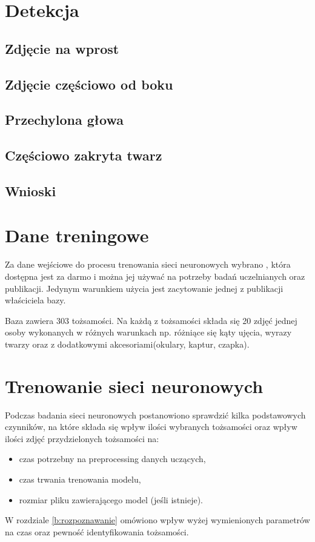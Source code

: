 \section{Detekcja}
\subsection{Zdjęcie na wprost}
\subsection{Zdjęcie częściowo od boku}
\subsection{Przechylona głowa}
\subsection{Częściowo zakryta twarz}
\subsection{Wnioski}

\section{Dane treningowe}
Za dane wejściowe do procesu trenowania sieci neuronowych wybrano , która dostępna jest za darmo i można jej używać na potrzeby badań uczelnianych oraz publikacji. Jedynym warunkiem użycia jest zacytowanie jednej z publikacji właściciela bazy.

Baza zawiera 303 tożsamości. Na każdą z tożsamości składa się 20 zdjęć jednej osoby wykonanych w różnych warunkach np. różniące się kąty ujęcia, wyrazy twarzy oraz z dodatkowymi akcesoriami(okulary, kaptur, czapka). 

\section{Trenowanie sieci neuronowych}
Podczas badania sieci neuronowych postanowiono sprawdzić kilka podstawowych czynników, na które składa się wpływ ilości wybranych tożsamości oraz wpływ ilości zdjęć przydzielonych tożsamości na:
\begin{itemize}
\item czas potrzebny na preprocessing danych uczących,
\item czas trwania trenowania modelu,
\item rozmiar pliku zawierającego model (jeśli istnieje).
\end{itemize}
W rozdziale \ref{b:rozpoznawanie} omówiono wpływ wyżej wymienionych parametrów na czas oraz pewność identyfikowania tożsamości.
